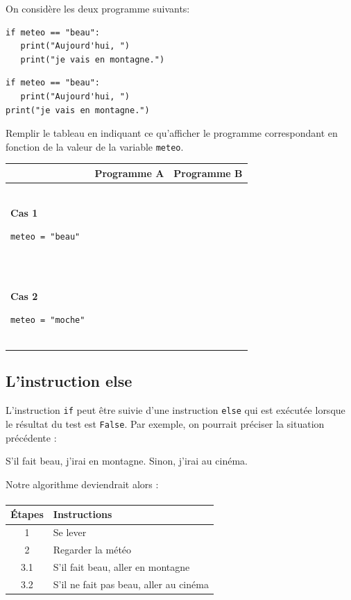 \act
On considère les deux programme suivants:
\begin{multicols}{2}
	\begin{lstlisting}[numbers=none]
if meteo == "beau":
   print("Aujourd'hui, ")
   print("je vais en montagne.")
	\end{lstlisting}
	
	\begin{lstlisting}[numbers=none]
if meteo == "beau":
   print("Aujourd'hui, ")
print("je vais en montagne.")
	\end{lstlisting}
\end{multicols}

Remplir le tableau en indiquant ce qu'afficher le programme correspondant en fonction de la valeur de la variable \lstinline{meteo}.

\begin{center}
	\begin{tabular}{p{4cm}|p{6cm}|p{6cm}} 
		& \textbf{Programme A} & \textbf{Programme B}  \\ 
		\hline
		\textbf{Cas 1}\par \lstinline!meteo = "beau"! & \  \par\     \  \par\           &              \\ 
		\hline
		\textbf{Cas 2}\par \lstinline!meteo = "moche"! &    \  \par\   \  \par\            &              \\ 
	\end{tabular}
\end{center}
\newpage

\subsection{L'instruction \textsf{else}}
L'instruction \lstinline{if} peut être suivie d'une instruction \lstinline{else} qui est exécutée lorsque le résultat du test est \lstinline{False}. Par exemple, on pourrait préciser la situation précédente :  
\begin{myexample} 
	S'il fait beau, j'irai en montagne. Sinon, j'irai au cinéma. 
\end{myexample}
Notre algorithme deviendrait alors : 
\paragraph{}
\begin{tabular}{ c  l  }
	Étapes & Instructions \\ \hline
	1 & Se lever  \\ 
	2 & Regarder la météo  \\
	3.1 & S'il fait beau, aller en montagne  \\
	3.2 & S'il ne fait pas beau, aller au cinéma  \\
\end{tabular}

